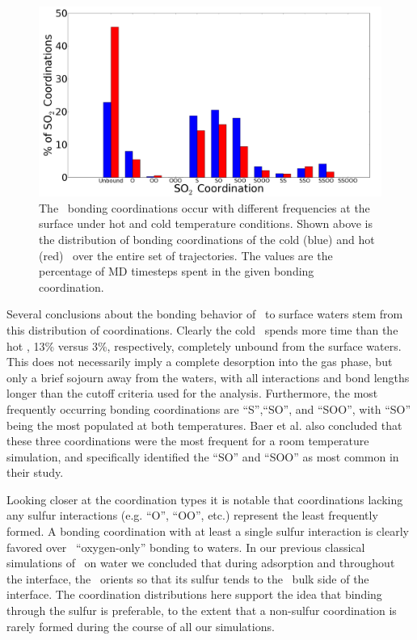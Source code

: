 \documentclass{article}
\begin{document}
\begin{figure}[h!]
	\begin{center}
		\includegraphics[scale=1.0]{coordination-distributions.png}
		\caption{The \suldiox~bonding coordinations occur with different frequencies at the surface under hot and cold temperature conditions. Shown above is the distribution of bonding coordinations of the cold (blue) and hot (red) \suldiox~over the entire set of trajectories. The values are the percentage of MD timesteps spent in the given bonding coordination.}
		\label{fig:bonding-coordinations}
	\end{center}
\end{figure}

	Several conclusions about the bonding behavior of \suldiox~to surface waters stem from this distribution of coordinations. Clearly the cold \suldiox~spends more time than the hot \suldiox, 13\% versus 3\%, respectively, completely unbound from the surface waters. This does not necessarily imply a complete desorption into the gas phase, but only a brief sojourn away from the waters, with all interactions and bond lengths longer than the cutoff criteria used for the analysis. Furthermore, the most frequently occurring bonding coordinations are ``S'',``SO'', and ``SOO'', with ``SO'' being the most populated at both temperatures. Baer et al. also concluded that these three coordinations were the most frequent for a room temperature simulation, and specifically identified the ``SO'' and ``SOO'' as most common in their study.\cite{Baer2010}

	Looking closer at the coordination types it is notable that coordinations lacking any sulfur interactions (e.g. ``O'', ``OO'', etc.) represent the least frequently formed. A bonding coordination with at least a single sulfur interaction is clearly favored over \suldiox~``oxygen-only'' bonding to waters. In our previous classical simulations of \suldiox~on water we concluded that during adsorption and throughout the interface, the \suldiox~orients so that its sulfur tends to the \wat~bulk side of the interface.\cite{Shamay2011} The coordination distributions here support the idea that binding through the sulfur is preferable, to the extent that a non-sulfur coordination is rarely formed during the course of all our simulations.
\end{document}
